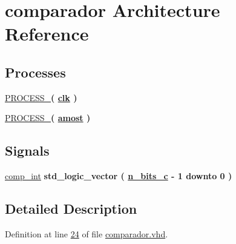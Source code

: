\hypertarget{classcomparador_1_1comparador}{}\section{comparador Architecture Reference}
\label{classcomparador_1_1comparador}
\subsection*{Processes}
 \begin{DoxyCompactItemize}
\item 
\hyperlink{classcomparador_1_1comparador_a67cbd29443fafed2b0446c1321a8e91c}{P\+R\+O\+C\+E\+S\+S\+\_}{\bfseries  ( {\bfseries {\bfseries \hyperlink{classcomparador_a4a4609c199d30b3adebbeb3a01276ec5}{clk}} \textcolor{vhdlchar}{ }} )}
\item 
\hyperlink{classcomparador_1_1comparador_ab820ba1b225bbde57824e0ed4510038c}{P\+R\+O\+C\+E\+S\+S\+\_}{\bfseries  ( {\bfseries {\bfseries \hyperlink{classcomparador_af9b8278b961604ab62a822537a109adb}{amost}} \textcolor{vhdlchar}{ }} )}
\end{DoxyCompactItemize}
\subsection*{Signals}
 \begin{DoxyCompactItemize}
\item 
\hyperlink{classcomparador_1_1comparador_abf7d8be25624dd08fcc1517c8e39cb23}{comp\+\_\+int} {\bfseries \textcolor{comment}{std\+\_\+logic\+\_\+vector}\textcolor{vhdlchar}{ }\textcolor{vhdlchar}{(}\textcolor{vhdlchar}{ }\textcolor{vhdlchar}{ }\textcolor{vhdlchar}{ }\textcolor{vhdlchar}{ }{\bfseries \hyperlink{classcomparador_afee4aa1628956aa350183d8881689198}{n\+\_\+bits\+\_\+c}} \textcolor{vhdlchar}{-\/}\textcolor{vhdlchar}{ } \textcolor{vhdldigit}{1} \textcolor{vhdlchar}{ }\textcolor{keywordflow}{downto}\textcolor{vhdlchar}{ }\textcolor{vhdlchar}{ } \textcolor{vhdldigit}{0} \textcolor{vhdlchar}{ }\textcolor{vhdlchar}{)}\textcolor{vhdlchar}{ }} 
\end{DoxyCompactItemize}


\subsection{Detailed Description}


Definition at line \hyperlink{comparador_8vhd_source_l00024}{24} of file \hyperlink{comparador_8vhd_source}{comparador.\+vhd}.



